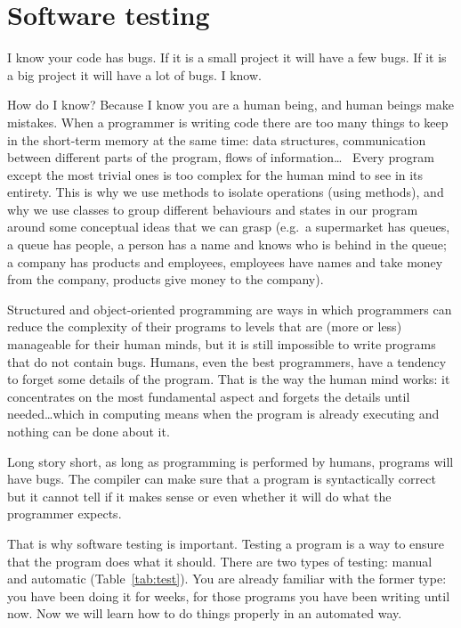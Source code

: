 
\section{Software testing}
\label{sec:software-testing}

I know your code has bugs. If it is a small project it will have a few
bugs. If it is a big project it will have a lot of bugs. I know.

How do I know? Because I know you are a human being, and human beings
make mistakes. When a programmer is writing code there are too
many things to keep in the short-term memory at the same time: data
structures, communication between different parts of the program,
flows of information\ldots ~ Every program except the most trivial ones is
too complex for the human mind to see in its entirety. This is why we
use methods to isolate operations (using methods), and
why we use classes to group different behaviours and states in our program
around some conceptual ideas that we can grasp (e.g.~a supermarket has
queues, a queue has people, a person has a name and knows who is
behind in the queue; a company has products and employees, employees
have names and take money from the company, products give money to the
company). 

Structured and object-oriented programming are ways in which
programmers can reduce the complexity of their programs to levels that
are (more or less) manageable for their human minds, 
but it is still impossible to write
programs that do not contain bugs. Humans, even the best programmers,
have a tendency to forget some details of the program. That is the way
the human mind works: it concentrates on the most fundamental aspect
and forgets the details until needed\ldots which in computing means
when the program is already executing and nothing can be done about
it. 

Long story short, as long as programming is performed by humans,
programs will have bugs. The compiler can make sure that a program is
syntactically correct but it cannot tell if  it makes sense or
even whether it will do what the programmer expects. 

That is why software testing is important. Testing a program is a way
to ensure that the program does what it should. There are two types of
testing: manual and automatic (Table~\ref{tab:test}). You are already
familiar with the former type: you have been doing it for weeks, for
those programs you have been writing until now. Now we will learn how to
do things properly in an automated way. 

